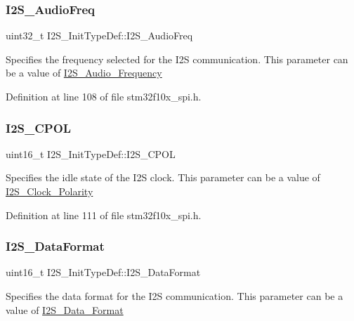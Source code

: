 \subsubsection{\texorpdfstring{I2\+S\+\_\+\+Audio\+Freq}{I2S\_AudioFreq}}
{\footnotesize\ttfamily uint32\+\_\+t I2\+S\+\_\+\+Init\+Type\+Def\+::\+I2\+S\+\_\+\+Audio\+Freq}

Specifies the frequency selected for the I2S communication. This parameter can be a value of \hyperlink{group___i2_s___audio___frequency}{I2\+S\+\_\+\+Audio\+\_\+\+Frequency} 

Definition at line 108 of file stm32f10x\+\_\+spi.\+h.

\mbox{\label{struct_i2_s___init_type_def_aeb7741728520734ec2eab95d2143778c}} 
\subsubsection{\texorpdfstring{I2\+S\+\_\+\+C\+P\+OL}{I2S\_CPOL}}
{\footnotesize\ttfamily uint16\+\_\+t I2\+S\+\_\+\+Init\+Type\+Def\+::\+I2\+S\+\_\+\+C\+P\+OL}

Specifies the idle state of the I2S clock. This parameter can be a value of \hyperlink{group___i2_s___clock___polarity}{I2\+S\+\_\+\+Clock\+\_\+\+Polarity} 

Definition at line 111 of file stm32f10x\+\_\+spi.\+h.

\mbox{\label{struct_i2_s___init_type_def_ad5e59034081427fd638983c10f18e833}} 
\subsubsection{\texorpdfstring{I2\+S\+\_\+\+Data\+Format}{I2S\_DataFormat}}
{\footnotesize\ttfamily uint16\+\_\+t I2\+S\+\_\+\+Init\+Type\+Def\+::\+I2\+S\+\_\+\+Data\+Format}

Specifies the data format for the I2S communication. This parameter can be a value of \hyperlink{group___i2_s___data___format}{I2\+S\+\_\+\+Data\+\_\+\+Format} 

